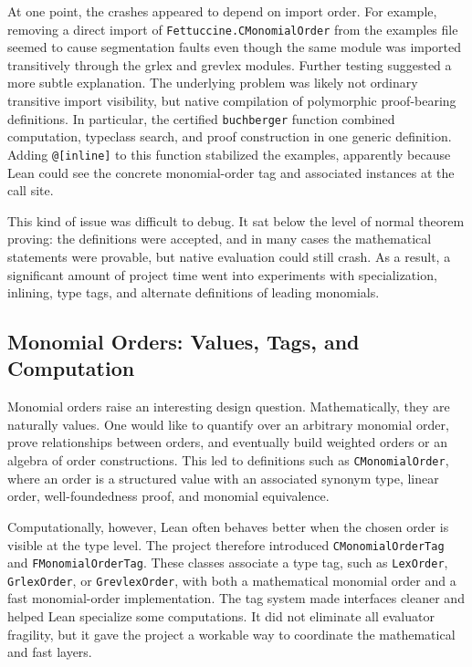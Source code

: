 \documentclass[acmsmall,nonacm,screen]{acmart}
\begin{document}
At one point, the crashes appeared to depend on import order.
For example, removing a direct import of \texttt{Fettuccine.CMonomialOrder} from the examples file
seemed to cause segmentation faults even though the same module was imported transitively through
the grlex and grevlex modules.
Further testing suggested a more subtle explanation.
The underlying problem was likely not ordinary transitive import visibility, but native compilation
of polymorphic proof-bearing definitions.
In particular, the certified \texttt{buchberger} function combined computation, typeclass search,
and proof construction in one generic definition.
Adding \texttt{@[inline]} to this function stabilized the examples, apparently because Lean could
see the concrete monomial-order tag and associated instances at the call site.

This kind of issue was difficult to debug.
It sat below the level of normal theorem proving: the definitions were accepted, and in many cases
the mathematical statements were provable, but native evaluation could still crash.
As a result, a significant amount of project time went into experiments with specialization,
inlining, type tags, and alternate definitions of leading monomials.

\subsection{Monomial Orders: Values, Tags, and Computation}

Monomial orders raise an interesting design question.
Mathematically, they are naturally values.
One would like to quantify over an arbitrary monomial order, prove relationships between orders, and
eventually build weighted orders or an algebra of order constructions.
This led to definitions such as \texttt{CMonomialOrder}, where an order is a structured value with
an associated synonym type, linear order, well-foundedness proof, and monomial equivalence.

Computationally, however, Lean often behaves better when the chosen order is visible at the type
level.
The project therefore introduced \texttt{CMonomialOrderTag} and \texttt{FMonomialOrderTag}.
These classes associate a type tag, such as \texttt{LexOrder}, \texttt{GrlexOrder}, or
\texttt{GrevlexOrder}, with both a mathematical monomial order and a fast monomial-order
implementation.
The tag system made interfaces cleaner and helped Lean specialize some computations.
It did not eliminate all evaluator fragility, but it gave the project a workable way to coordinate
the mathematical and fast layers.
\end{document}

